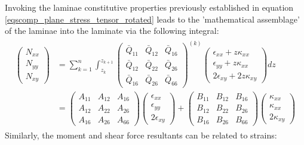 Invoking the laminae constitutive properties previously established in equation \ref{eqscomp_plane_stress_tensor_rotated} leads to the 'mathematical assemblage' of the laminae into the laminate via the following integral:
\begin{gather} 
	\begin{aligned}
		\begin{pmatrix}
			N_{xx} \\
			N_{yy} \\
			N_{xy} 
		\end{pmatrix} 
		& = 
		\sum_{k=1}^n
		\int_{z_k}^{z_{k+1}}
		{\begin{pmatrix}
			\bar{Q}_{11} & \bar{Q}_{12} &  \bar{Q}_{16} \\
			\bar{Q}_{12} & \bar{Q}_{22} &  \bar{Q}_{26} \\
			\bar{Q}_{16} & \bar{Q}_{26} & \bar{Q}_{66} 
		\end{pmatrix}}^{(k)}
		\begin{pmatrix}
			\epsilon_{xx} + z \kappa_{xx}\\
			\epsilon_{yy} + z \kappa_{xx}\\
			2\epsilon_{xy} + 2z\kappa_{xy}
		\end{pmatrix}
		dz \\
		& =
		\begin{pmatrix}
			{A}_{11} & {A}_{12} &  {A}_{16} \\
			{A}_{12} & {A}_{22} &  {A}_{26} \\
			{A}_{16} & {A}_{26} & {A}_{66} 
		\end{pmatrix}
		\begin{pmatrix}
		\epsilon_{xx}\\
		\epsilon_{yy}\\
		2\epsilon_{xy}
		\end{pmatrix}
		+
		\begin{pmatrix}
		{B}_{11} & {B}_{12} &  {B}_{16} \\
		{B}_{12} & {B}_{22} &  {B}_{26} \\
		{B}_{16} & {B}_{26} & {B}_{66} 
		\end{pmatrix}
		\begin{pmatrix}
		 \kappa_{xx}\\
		\kappa_{xx}\\
		2\kappa_{xy}
		\end{pmatrix}
		\label{eqscomp_laminate_constitutive3}
	\end{aligned}
\end{gather}
Similarly, the moment and shear force resultants can be related to strains:
